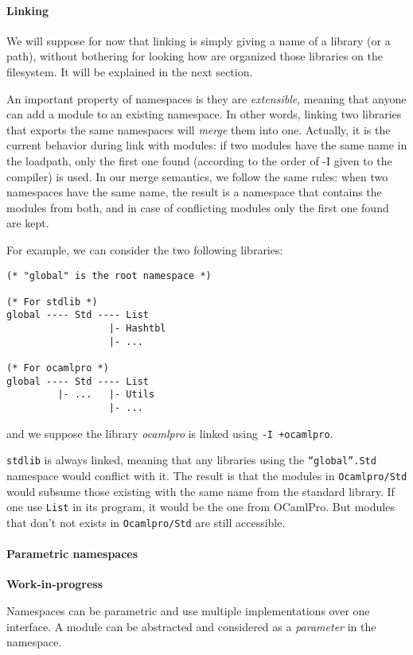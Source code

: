 \documentclass[11pt,a4paper]{article}
\begin{document}
\paragraph{Linking} We will suppose for now that linking is simply giving a name
of a library (or a path), without bothering for looking how are organized those
libraries on the filesystem. It will be explained in the next section.

An important property of namespaces is they are \emph{extensible}, meaning that
anyone can add a module to an existing namespace. In other words, linking two
libraries that exports the same namespaces will \emph{merge} them into
one. Actually, it is the current behavior during link with modules: if two
modules have the same name in the loadpath, only the first one found (according
to the order of -I given to the compiler) is used. In our merge semantics, we
follow the same rules: when two namespaces have the same name, the result is a
namespace that contains the modules from both, and in case of conflicting
modules only the first one found are kept.

For example, we can consider the two following libraries:

\begin{verbatim}
(* "global" is the root namespace *)

(* For stdlib *)
global ---- Std ---- List
                  |- Hashtbl
                  |- ...

(* For ocamlpro *)
global ---- Std ---- List
         |- ...   |- Utils
                  |- ...
\end{verbatim}
and we suppose the library \emph{ocamlpro} is linked using \texttt{-I +ocamlpro}.

\texttt{stdlib} is always linked, meaning that any libraries using the
\texttt{``global''.Std} namespace would conflict with it. The result is that the
modules in \texttt{Ocamlpro/Std} would subsume those existing with the same name
from the standard library. If one use \texttt{List} in its program, it would be
the one from OCamlPro. But modules that don't not exists in
\texttt{Ocamlpro/Std} are still accessible.


\paragraph{Parametric namespaces}

\textbf{Work-in-progress}

Namespaces can be parametric and use multiple implementations over one
interface. A module can be abstracted and considered as a \emph{parameter} in
the namespace. 
\end{document}
